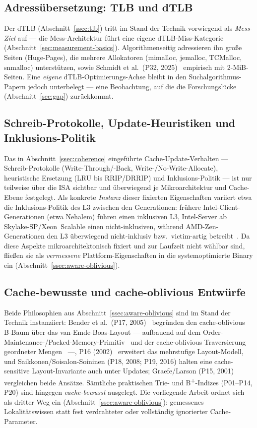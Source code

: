 \subsection{Adressübersetzung: TLB und dTLB}\label{ssec:sota-tlb}
Der dTLB (Abschnitt~\ref{ssec:tlb}) tritt im Stand der Technik vorwiegend als \emph{Mess-Ziel} auf
--- die Mess-Architektur führt eine eigene dTLB-Miss-Kategorie
(Abschnitt~\ref{sec:measurement-basics}). Algorithmenseitig adressieren ihn große Seiten
(Huge-Pages), die mehrere Allokatoren (mimalloc, jemalloc, TCMalloc, snmalloc) unterstützen, sowie
Schmidt et al.\ (P32, 2025)~\cite{schmidt2025hbm} empirisch mit 2-MiB-Seiten. Eine \emph{eigene}
dTLB-Optimierungs-Achse bleibt in den Suchalgorithmus-Papern jedoch unterbelegt --- eine
Beobachtung, auf die die Forschungslücke (Abschnitt~\ref{sec:gap}) zurückkommt.

\subsection{Schreib-Protokolle, Update-Heuristiken und Inklusions-Politik}\label{ssec:sota-update}
Das in Abschnitt~\ref{ssec:coherence} eingeführte Cache-Update-Verhalten --- Schreib-Protokolle
(Write-Through/-Back, Write-/No-Write-Allocate), heuristische Ersetzung (LRU bis RRIP/DRRIP) und
Inklusions-Politik --- ist nur teilweise über die ISA sichtbar und überwiegend je Mikroarchitektur
und Cache-Ebene festgelegt. Als konkrete \emph{Instanz} dieser fixierten Eigenschaften variiert etwa
die Inklusions-Politik des L3 zwischen den Generationen: frühere Intel-Client-Generationen (etwa
Nehalem) führen einen inklusiven L3, Intel-Server ab Skylake-SP/Xeon~Scalable einen
nicht-inklusiven, während AMD-Zen-Generationen den L3 überwiegend nicht-inklusiv bzw.\ victim-artig
betreibt~\cite{intel_optimization,amd_sog}. Da diese Aspekte mikroarchitektonisch fixiert und zur
Laufzeit nicht wählbar sind, fließen sie als \emph{vermessene} Plattform-Eigenschaften in die
systemoptimierte Binary ein (Abschnitt~\ref{ssec:aware-oblivious}).

\subsection{Cache-bewusste und cache-oblivious Entwürfe}\label{ssec:sota-aware}
Beide Philosophien aus Abschnitt~\ref{ssec:aware-oblivious} sind im Stand der Technik instanziiert:
Bender et al.\ (P17, 2005)~\cite{bender2005coboblivious} begründen den cache-oblivious B-Baum über
das van-Emde-Boas-Layout --- aufbauend auf dem
Order-Maintenance-/Packed-Memory-Primitiv~\cite{bender2002orderlist} und der cache-oblivious
Traversierung geordneter Mengen~\cite{bender2002scanning} ---, P16 (2002)~\cite{bender2000cobtree}
erweitert das mehrstufige Layout-Modell, und Saikkonen/Soisalon-Soininen (P18, 2008; P19, 2016)
halten eine cache-sensitive Layout-Invariante auch unter Updates; Graefe/Larson (P15,
2001)~\cite{graefe2001btree} vergleichen beide Ansätze. Sämtliche praktischen Trie- und
B\textsuperscript{+}-Indizes (P01--P14, P20) sind hingegen \emph{cache-bewusst} ausgelegt. Die
vorliegende Arbeit ordnet sich als dritter Weg ein (Abschnitt~\ref{ssec:aware-oblivious}):
gemessenes Lokalitätswissen statt fest verdrahteter oder vollständig ignorierter Cache-Parameter.

